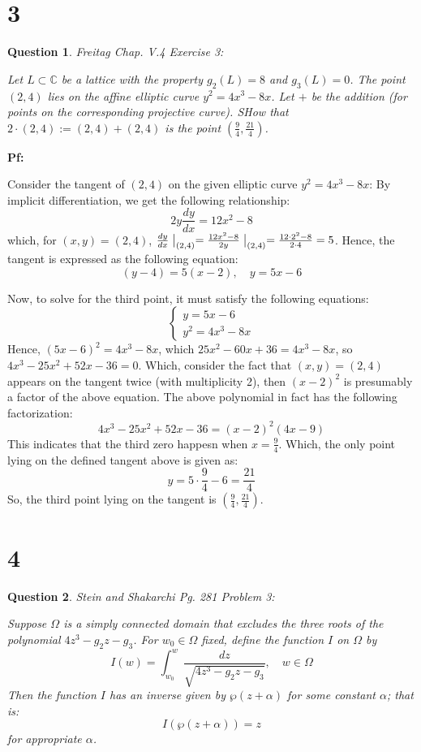 \documentclass{article}
\newtheorem{question}{Question}
\begin{document}
\break

\section*{3}
\begin{myBox}[]{}
    \begin{question}
        Freitag Chap. V.4 Exercise 3:

        Let $L\subset \mathbb{C}$ be a lattice with the property $g_2(L)=8$ and $g_3(L)=0$. The point $(2,4)$ lies on the affine elliptic curve $y^2=4x^3-8x$.
        Let $+$ be the addition (for points on the corresponding projective curve). SHow that $2\cdot (2,4):= (2,4)+(2,4)$ is the point $(\frac{9}{4},\frac{21}{4})$.
    \end{question}
\end{myBox}

\textbf{Pf:}

Consider the tangent of $(2,4)$ on the given elliptic curve $y^2=4x^3-8x$: By implicit differentiation, we get the following relationship:
$$2y\frac{dy}{dx}=12x^2-8$$
which, for $(x,y)=(2,4)$, $\frac{dy}{dx}\bigm|_{(2,4)}=\frac{12x^2-8}{2y}\bigm|_{(2,4)} = \frac{12\cdot 2^2-8}{2\cdot 4} = 5$. Hence, the tangent is expressed as the following equation:
$$(y-4)=5(x-2),\quad y=5x-6$$

\hfil

Now, to solve for the third point, it must satisfy the following equations:
$$\begin{cases}
    y=5x-6\\
    y^2=4x^3-8x
\end{cases}$$
Hence, $(5x-6)^2 = 4x^3-8x$, which $25x^2-60x+36 = 4x^3-8x$, so $4x^3-25x^2+52x-36 = 0$. Which, consider the fact that $(x,y)=(2,4)$ appears on the tangent twice (with multiplicity 2),
then $(x-2)^2$ is presumably a factor of the above equation. The above polynomial in fact has the following factorization:
$$4x^3-25x^2+52x-36 = (x-2)^2(4x-9)$$
This indicates that the third zero happesn when $x=\frac{9}{4}$. Which, the only point lying on the defined tangent above is given as:
$$y=5\cdot\frac{9}{4}-6 = \frac{21}{4}$$
So, the third point lying on the tangent is $(\frac{9}{4},\frac{21}{4})$.


\break

\section*{4}
\begin{myBox}[]{}
    \begin{question}
        Stein and Shakarchi Pg. 281 Problem 3:

        Suppose $\Omega$ is a simply connected domain that excludes the three roots of the polynomial $4z^3-g_2z-g_3$.
        For $w_0\in\Omega$ fixed, define the function $I$ on $\Omega$ by 
        $$I(w)=\int_{w_0}^{w}\frac{dz}{\sqrt{4z^3-g_2z-g_3}},\quad w\in\Omega$$
        Then the function $I$ has an inverse given by $\wp(z+\alpha)$ for some constant $\alpha$; that is:
        $$I(\wp(z+\alpha))=z$$
        for appropriate $\alpha$.
    \end{question}
\end{myBox}
\end{document}
